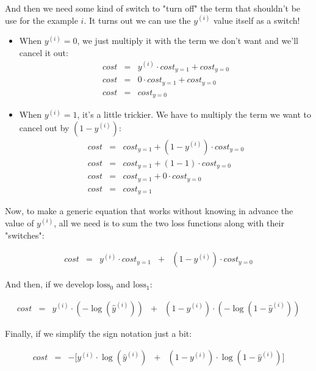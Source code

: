 And then we need some kind of switch to "turn off" the term that shouldn't be use for the example $i$.
It turns out we can use the $y^{(i)}$ value itself as a switch! 
\begin{itemize}
    \item When $y^{(i)} = 0$, we just multiply it with the term we don't want and we'll cancel it out:
          $$
          \begin{matrix}
          cost & = & y^{(i)} \cdot cost_{y=1} + cost_{y=0} \\
          cost & = & 0 \cdot cost_{y=1} + cost_{y=0} \\
          cost & = & cost_{y=0}
          \end{matrix}
          $$
    
    \item When $y^{(i)} = 1$, it's a little trickier. We have to multiply the term we want to cancel out by $(1 - y^{(i)})$:
          $$
          \begin{matrix}
          cost & = & cost_{y=1} + (1 - y^{(i)}) \cdot cost_{y=0} \\
          cost & = & cost_{y=1} + (1 - 1) \cdot cost_{y=0} \\
          cost & = & cost_{y=1} + 0 \cdot cost_{y=0}  \\
          cost & = & cost_{y=1}
          \end{matrix}
          $$
\end{itemize}

Now, to make a generic equation that works without knowing in advance the value of $y^{(i)}$, all we need is to sum the two loss functions along with their "switches":

$$
\begin{matrix}
cost & = & y^{(i)} \cdot cost_{y=1} & + & (1 - y^{(i)}) \cdot cost_{y=0}
\end{matrix}
$$

And then, if we develop $\text{loss}_0$ and $\text{loss}_1$:

$$
\begin{matrix}
cost & = & y^{(i)} \cdot (-\log(\hat{y}^{(i)})) & + & (1 - y^{(i)}) \cdot (-\log(1 - \hat{y}^{(i)}))
\end{matrix}
$$

Finally, if we simplify the sign notation just a bit:

$$
\begin{matrix}
cost & = & -[y^{(i)}\cdot\log(\hat{y}^{(i)}) & + & (1 - y^{(i)})\cdot\log(1 - \hat{y}^{(i)})]
\end{matrix}
$$


